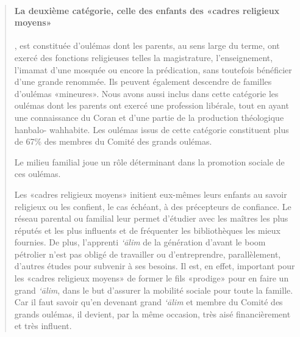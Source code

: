\begin{quote}
 \paragraph{La deuxième catégorie, celle des enfants des «cadres religieux
moyens»}, est constituée d'oulémas dont les parents, au sens large du
terme, ont exercé des fonctions religieuses telles la magistrature,
l'enseignement, l'imamat d'une mosquée ou encore la prédication, sans
toutefois bénéficier d'une grande renommée. Ils peuvent également
descendre de familles d'oulémas «mineures». Nous avons aussi inclus dans
cette catégorie les oulémas dont les parents ont exercé une profession
libérale, tout en ayant une connaissance du Coran et d'une partie de la
production théologique hanbalo-
wahhabite. Les oulémas issus de cette catégorie constituent plus de 67\%
des membres du Comité des grands oulémas.

Le milieu familial joue un rôle déterminant dans la promotion sociale
de ces oulémas.

Les «cadres religieux moyens» initient eux-mêmes leurs enfants au savoir
religieux ou les confient, le cas échéant, à des précepteurs de
confiance. Le réseau parental ou familial leur permet d'étudier avec les
maîtres les plus réputés et les plus influents et de fréquenter les
bibliothèques les mieux fournies. De plus, l'apprenti \emph{`ālim} de la
génération d'avant le boom pétrolier n'est pas obligé de travailler ou
d'entreprendre, parallèlement, d'autres études pour subvenir à ses
besoins. Il est, en effet, important pour les «cadres religieux moyens»
de former le fils «prodige» pour en faire un grand \emph{`ālim}, dans le
but d'assurer la mobilité sociale pour toute la famille. Car il faut
savoir qu'en devenant grand \emph{`ālim} et membre du Comité des grands
oulémas, il devient, par la même occasion, très aisé financièrement et
très influent.


\end{quote}
